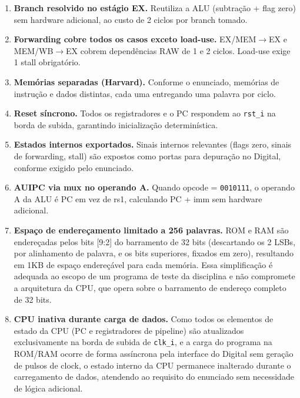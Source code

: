 \documentclass[12pt, a4paper]{article}
\newcommand{\code}[1]{\texttt{#1}}
\begin{document}
\begin{enumerate}[leftmargin=2em]
  \item \textbf{Branch resolvido no estágio EX.} Reutiliza a ALU (subtração
    + flag zero) sem hardware adicional, ao custo de 2 ciclos por branch tomado.

  \item \textbf{Forwarding cobre todos os casos exceto load-use.} EX/MEM$\to$EX
    e MEM/WB$\to$EX cobrem dependências RAW de 1 e 2 ciclos. Load-use exige
    1 stall obrigatório.

  \item \textbf{Memórias separadas (Harvard).} Conforme o enunciado, memórias
    de instrução e dados distintas, cada uma entregando uma palavra por ciclo.

  \item \textbf{Reset síncrono.} Todos os registradores e o PC respondem ao
    \code{rst\_i} na borda de subida, garantindo inicialização determinística.

  \item \textbf{Estados internos exportados.} Sinais internos relevantes (flags
    zero, sinais de forwarding, stall) são expostos como portas para depuração
    no Digital, conforme exigido pelo enunciado.

  \item \textbf{AUIPC via mux no operando A.} Quando opcode = \code{0010111},
    o operando A da ALU é PC em vez de rs1, calculando PC + imm sem
    hardware adicional.

  \item \textbf{Espaço de endereçamento limitado a 256 palavras.} ROM e RAM
    são endereçadas pelos bits [9:2] do barramento de 32 bits (descartando
    os 2 LSBs, por alinhamento de palavra, e os bits superiores, fixados em
    zero), resultando em 1KB de espaço endereçável para cada memória. Essa
    simplificação é adequada ao escopo de um programa de teste da
    disciplina e não compromete a arquitetura da CPU, que opera sobre o
    barramento de endereço completo de 32 bits.

  \item \textbf{CPU inativa durante carga de dados.} Como todos os elementos
    de estado da CPU (PC e registradores de pipeline) são atualizados
    exclusivamente na borda de subida de \code{clk\_i}, e a carga do programa
    na ROM/RAM ocorre de forma assíncrona pela interface do Digital sem
    geração de pulsos de clock, o estado interno da CPU permanece
    inalterado durante o carregamento de dados, atendendo ao requisito do
    enunciado sem necessidade de lógica adicional.
\end{enumerate}
\end{document}
